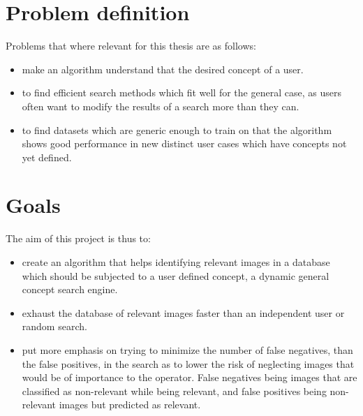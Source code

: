 \section{Problem definition}
Problems that where relevant for this thesis are as follows:
\begin{itemize}
	\item make an algorithm understand that the desired concept of a user.
	\item to find efficient search methods which fit well for the general case, as users often want to modify the results of a search more than they can. 
	\item to find datasets which are generic enough to train on that the algorithm shows good performance in new distinct user cases which have concepts not yet defined. 
\end{itemize}


\section{Goals}
\label{sec:intro:goals}
The aim of this project is thus to:
\begin{itemize} 
	\item create an algorithm that helps identifying relevant images in a database which should be subjected to a user defined concept, a dynamic general concept search engine. 
	\item exhaust the database of relevant images faster than an independent user or random search. 
	\item put more emphasis on trying to minimize the number of false negatives, than the false positives, in the search as to lower the risk of neglecting images that would be of importance to the operator. False negatives being images that are classified as non-relevant while being relevant, and false positives being non-relevant images but predicted as relevant. 
\end{itemize}

